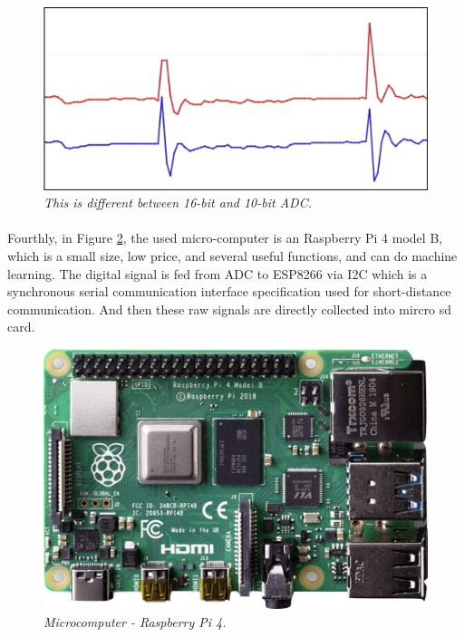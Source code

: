 \begin{figure}[H]
  \centering
  \caption[This is different between 16-bit and 10-bit ADC.]{\emph{This is different between 16-bit and 10-bit ADC. }}\label{fig:adc}
  \includegraphics[scale = 0.3]{figures/ADC.jpg}  
\end{figure}

\paragraph{}
Fourthly, in Figure \ref{fig:pi4}, the used micro-computer is an Raspberry Pi 4 model B, which is a small size, low price, and several useful functions, and can do machine learning. The digital signal is fed from ADC to ESP8266 via I2C which is a synchronous serial communication interface specification used for short-distance communication. And then these raw signals  are directly collected into mircro sd card.

\begin{figure}[H]
  \centering
  \caption[Microcomputer - Raspberry Pi 4.]{\emph{Microcomputer - Raspberry Pi 4.}}\label{fig:pi4}
  \includegraphics[scale = 0.3]{figures/pi4.jpg}  
\end{figure}

